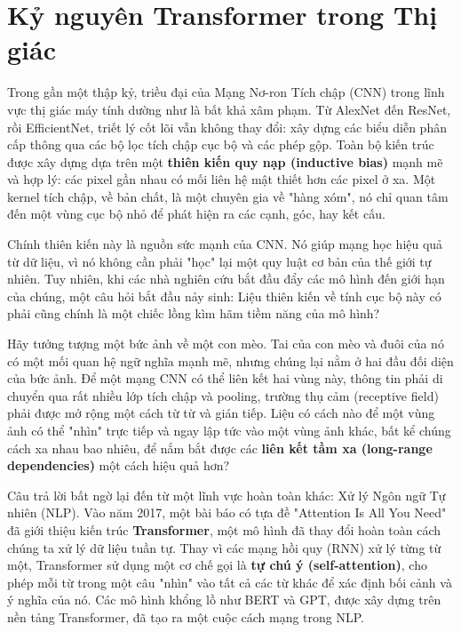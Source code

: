 \chapter{Kỷ nguyên Transformer trong Thị giác}
\label{chap:transformer_era}

Trong gần một thập kỷ, triều đại của Mạng Nơ-ron Tích chập (CNN) trong lĩnh vực thị giác máy tính dường như là bất khả xâm phạm. Từ AlexNet đến ResNet, rồi EfficientNet, triết lý cốt lõi vẫn không thay đổi: xây dựng các biểu diễn phân cấp thông qua các bộ lọc tích chập cục bộ và các phép gộp. Toàn bộ kiến trúc được xây dựng dựa trên một \textbf{thiên kiến quy nạp (inductive bias)} mạnh mẽ và hợp lý: các pixel gần nhau có mối liên hệ mật thiết hơn các pixel ở xa. Một kernel tích chập, về bản chất, là một chuyên gia về "hàng xóm", nó chỉ quan tâm đến một vùng cục bộ nhỏ để phát hiện ra các cạnh, góc, hay kết cấu.

Chính thiên kiến này là nguồn sức mạnh của CNN. Nó giúp mạng học hiệu quả từ dữ liệu, vì nó không cần phải "học" lại một quy luật cơ bản của thế giới tự nhiên. Tuy nhiên, khi các nhà nghiên cứu bắt đầu đẩy các mô hình đến giới hạn của chúng, một câu hỏi bắt đầu nảy sinh: Liệu thiên kiến về tính cục bộ này có phải cũng chính là một chiếc lồng kìm hãm tiềm năng của mô hình?

Hãy tưởng tượng một bức ảnh về một con mèo. Tai của con mèo và đuôi của nó có một mối quan hệ ngữ nghĩa mạnh mẽ, nhưng chúng lại nằm ở hai đầu đối diện của bức ảnh. Để một mạng CNN có thể liên kết hai vùng này, thông tin phải di chuyển qua rất nhiều lớp tích chập và pooling, trường thụ cảm (receptive field) phải được mở rộng một cách từ từ và gián tiếp. Liệu có cách nào để một vùng ảnh có thể "nhìn" trực tiếp và ngay lập tức vào một vùng ảnh khác, bất kể chúng cách xa nhau bao nhiêu, để nắm bắt được các \textbf{liên kết tầm xa (long-range dependencies)} một cách hiệu quả hơn?

Câu trả lời bất ngờ lại đến từ một lĩnh vực hoàn toàn khác: Xử lý Ngôn ngữ Tự nhiên (NLP). Vào năm 2017, một bài báo có tựa đề "Attention Is All You Need" đã giới thiệu kiến trúc \textbf{Transformer}, một mô hình đã thay đổi hoàn toàn cách chúng ta xử lý dữ liệu tuần tự. Thay vì các mạng hồi quy (RNN) xử lý từng từ một, Transformer sử dụng một cơ chế gọi là \textbf{tự chú ý (self-attention)}, cho phép mỗi từ trong một câu "nhìn" vào tất cả các từ khác để xác định bối cảnh và ý nghĩa của nó. Các mô hình khổng lồ như BERT và GPT, được xây dựng trên nền tảng Transformer, đã tạo ra một cuộc cách mạng trong NLP.

